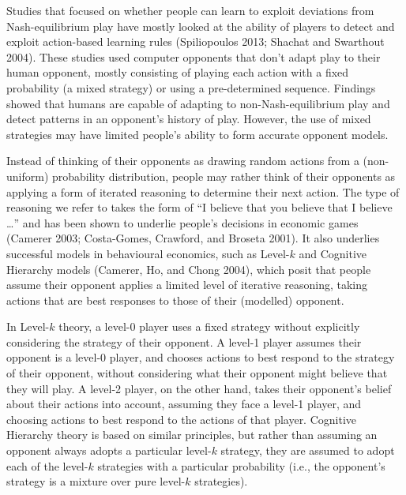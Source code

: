 \documentclass[smallextended]{svjour3}       %
\begin{document}
Studies that focused on whether people can learn to exploit deviations
from Nash-equilibrium play have mostly looked at the ability of players
to detect and exploit action-based learning rules (Spiliopoulos 2013;
Shachat and Swarthout 2004). These studies used computer opponents that
don't adapt play to their human opponent, mostly consisting of playing
each action with a fixed probability (a mixed strategy) or using a
pre-determined sequence. Findings showed that humans are capable of
adapting to non-Nash-equilibrium play and detect patterns in an
opponent's history of play. However, the use of mixed strategies may
have limited people's ability to form accurate opponent models.

Instead of thinking of their opponents as drawing random actions from a
(non-uniform) probability distribution, people may rather think of their
opponents as applying a form of iterated reasoning to determine their
next action. The type of reasoning we refer to takes the form of ``I
believe that you believe that I believe \ldots{}'' and has been shown to
underlie people's decisions in economic games (Camerer 2003;
Costa-Gomes, Crawford, and Broseta 2001). It also underlies successful
models in behavioural economics, such as Level-\(k\) and Cognitive
Hierarchy models (Camerer, Ho, and Chong 2004), which posit that people
assume their opponent applies a limited level of iterative reasoning,
taking actions that are best responses to those of their (modelled)
opponent.

In Level-\(k\) theory, a level-0 player uses a fixed strategy without
explicitly considering the strategy of their opponent. A level-1 player
assumes their opponent is a level-0 player, and chooses actions to best
respond to the strategy of their opponent, without considering what
their opponent might believe that they will play. A level-2 player, on
the other hand, takes their opponent's belief about their actions into
account, assuming they face a level-1 player, and choosing actions to
best respond to the actions of that player. Cognitive Hierarchy theory
is based on similar principles, but rather than assuming an opponent
always adopts a particular level-\(k\) strategy, they are assumed to
adopt each of the level-\(k\) strategies with a particular probability
(i.e., the opponent's strategy is a mixture over pure level-\(k\)
strategies).
\end{document}
